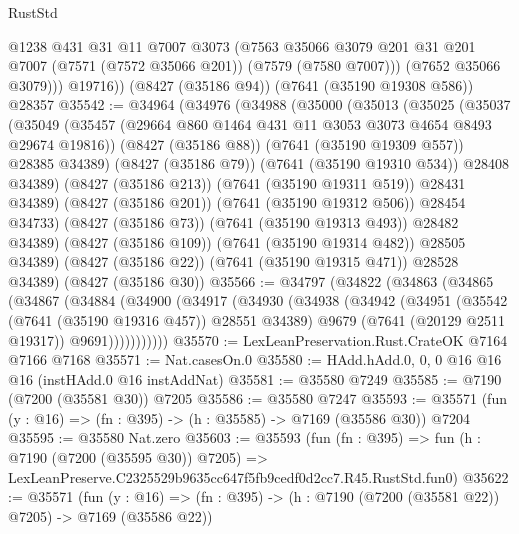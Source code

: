 \begin{lexlean}{RustStd}
\begin{coremodule}
            @1238
            @431
            @31
            @11
            @7007
            @3073
            (@7563
              @35066
              @3079
              @201
              @31
              @201
              @7007
              (@7571 (@7572 @35066 @201))
              (@7579 (@7580 @7007)))
            (@7652 @35066 @3079)))
        @19716))
    (@8427 (@35186 @94))
    (@7641 (@35190 @19308 @586))
    @28357
@35542 := @34964
    (@34976
      (@34988
        (@35000
          (@35013
            (@35025
              (@35037
                (@35049
                  (@35457 (@29664 @860 @1464 @431 @11 @3053 @3073 @4654 @8493 @29674 @19816))
                  (@8427 (@35186 @88))
                  (@7641 (@35190 @19309 @557))
                  @28385
                  @34389)
                (@8427 (@35186 @79))
                (@7641 (@35190 @19310 @534))
                @28408
                @34389)
              (@8427 (@35186 @213))
              (@7641 (@35190 @19311 @519))
              @28431
              @34389)
            (@8427 (@35186 @201))
            (@7641 (@35190 @19312 @506))
            @28454
            @34733)
          (@8427 (@35186 @73))
          (@7641 (@35190 @19313 @493))
          @28482
          @34389)
        (@8427 (@35186 @109))
        (@7641 (@35190 @19314 @482))
        @28505
        @34389)
      (@8427 (@35186 @22))
      (@7641 (@35190 @19315 @471))
      @28528
      @34389)
    (@8427 (@35186 @30))
@35566 := @34797
    (@34822
      (@34863
        (@34865
          (@34867
            (@34884
              (@34900
                (@34917
                  (@34930
                    (@34938
                      (@34942
                        (@34951
                          (@35542 (@7641 (@35190 @19316 @457)) @28551 @34389)
                          @9679
                          (@7641 (@20129 @2511 @19317))
                          @9691)))))))))))
@35570 := LexLeanPreservation.Rust.CrateOK @7164 @7166 @7168
@35571 := Nat.casesOn.{0}
@35580 := HAdd.hAdd.{0, 0, 0} @16 @16 @16 (instHAdd.{0} @16 instAddNat)
@35581 := @35580 @7249
@35585 := @7190 (@7200 (@35581 @30)) @7205
@35586 := @35580 @7247
@35593 := @35571 (fun (y : @16) => (fn : @395) -> (h : @35585) -> @7169 (@35586 @30)) @7204
@35595 := @35580 Nat.zero
@35603 := @35593
    (fun (fn : @395) =>
    fun (h : @7190 (@7200 (@35595 @30)) @7205) =>
    LexLeanPreserve.C2325529b9635cc647f5fb9cedf0d2cc7.R45.RustStd.fun0)
@35622 := @35571
    (fun (y : @16) => (fn : @395) -> (h : @7190 (@7200 (@35581 @22)) @7205) -> @7169 (@35586 @22))

\end{coremodule}
\end{lexlean}
